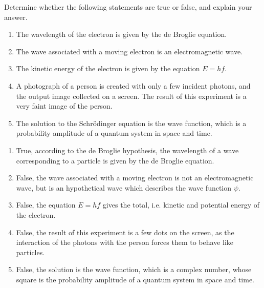 \documentclass[fleqn, a4paper, 11pt, oneside]{amsart}
\theoremstyle{definition}
\theoremstyle{theorem}
\begin{document}
\begin{question}
	Determine whether the following statements are true or false, and explain your answer.
	\begin{enumerate}
		\item
			The wavelength of the electron is given by the de Broglie equation.
		\item
			The wave associated with a moving electron is an electromagnetic wave.
		\item
			The kinetic energy of the electron is given by the equation $E = h f$.
		\item
			A photograph of a person is created with only a few incident photons, and the output image collected on a screen.
			The result of this experiment is a very faint image of the person.
		\item
			The solution to the Schrödinger equation is the wave function, which is a probability amplitude of a quantum system in space and time.
	\end{enumerate}
\end{question}

\begin{solution}
	\begin{enumerate}[leftmargin=*]
		\item
			True, according to the de Broglie hypothesis, the wavelength of a wave corresponding to a particle is given by the de Broglie equation.
		\item
			False, the wave associated with a moving electron is not an electromagnetic wave, but is an hypothetical wave which describes the wave function $\psi$.
		\item
			False, the equation $E = h f$ gives the total, i.e. kinetic and potential energy of the electron.
		\item
			False, the result of this experiment is a few dots on the screen, as the interaction of the photons with the person forces them to behave like particles.
		\item
			False, the solution is the wave function, which is a complex number, whose square is the probability amplitude of a quantum system in space and time.
	\end{enumerate}
\end{solution}
\end{document}

